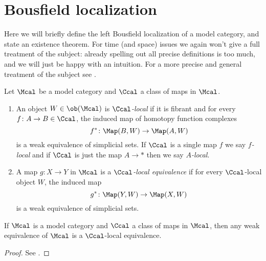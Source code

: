    \section{Bousfield localization}
        Here we will briefly define the left Bousfield localization of a model category, and state an existence theorem. For time (and space) issues we again won't give a full treatment of the subject: already spelling out all precise definitions is too much, and we will just be happy with an intuition. 
        For a more precise and general treatment of the subject see \cite[Chapter~3-4]{Hirs:loc}.
        \begin{defn}
            \label{defn:C_local_objects}
            Let $\Mcal$ be a model category and $\Ccal$ a class of maps in $\Mcal$. 
            \begin{enumerate}
                \item An object $W \in \ob(\Mcal)$ is \emph{$\Ccal$-local} if it is fibrant and for every $f\colon A \to B \in \Ccal$, the induced map of homotopy function complexes \[f^*\colon \Map(B, W) \to \Map(A, W) \] is a weak equivalence of simplicial sets. If $\Ccal$ is a single map $f$ we say \emph{$f$-local} and if $\Ccal$ is just the map $A \to *$ then we say \emph{$A$-local}.
                \item A map $g\colon X \to Y$ in $\Mcal$ is a \emph{$\Ccal$-local equivalence} if for every $\Ccal$-local object $W$, the induced map \[g^*\colon \Map(Y, W) \to \Map(X, W) \] is a weak equivalence of simplicial sets.
            \end{enumerate}
        \end{defn}
        \begin{prop}
            \label{prop:weak_equiv_C_local}
            If $\Mcal$ is a model category and $\Ccal$ a class of maps in $\Mcal$, then any weak equivalence of $\Mcal$ is a $\Ccal$-local equivalence.
        \end{prop}
        \begin{proof}
            See \cite[Proposition~3.1.5]{Hirs:loc}.
        \end{proof}

